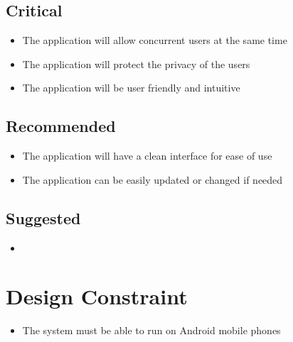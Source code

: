 \subsection{Critical}
	\begin{itemize}
		\item The application will allow concurrent users at the same time
		\item The application will protect the privacy of the users
		\item The application will be user friendly and intuitive
	\end{itemize}
\subsection{Recommended}
	\begin{itemize}
		\item The application will have a clean interface for ease of use
		\item The application can be easily updated or changed if needed
	\end{itemize}
\subsection{Suggested}
	\begin{itemize}
		\item 
	\end{itemize}

\section{Design Constraint}
	\begin{itemize}
		\item The system must be able to run on Android mobile phones
	\end{itemize}